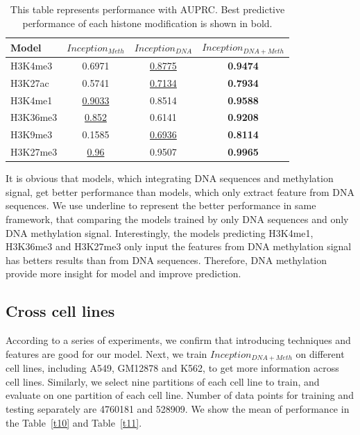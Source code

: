 \begin{table}[H]%
    \centering
    \begin{tabular}{lccc}
    \hline
    Model & $Inception_{Meth}$ & $Inception_{DNA}$ & $Inception_{DNA+Meth}$ \\\hline
    H3K4me3 & 0.6971 & \underline{0.8775} & \textbf{0.9474} \\
    H3K27ac & 0.5741 & \underline{0.7134} & \textbf{0.7934} \\
    H3K4me1 & \underline{0.9033} & 0.8514 & \textbf{0.9588} \\
    H3K36me3 & \underline{0.852} & 0.6141 & \textbf{0.9208} \\
    H3K9me3 & 0.1585 & \underline{0.6936} & \textbf{0.8114} \\
    H3K27me3 & \underline{0.96} & 0.9507 & \textbf{0.9965} \\\hline
    \end{tabular}
    \captionsetup{labelfont=bf}
    \renewcommand{\baselinestretch}{1.0}
    \caption[Comparison of different inputs of inception with AUPRC]{This table represents performance with AUPRC. Best predictive performance of each histone modification is shown in bold.}
    \label{t9}
\end{table}

It is obvious that models, which integrating DNA sequences and methylation signal, get better performance than models, which only extract feature from DNA sequences. We use underline to represent the better performance in same framework, that comparing the models trained by only DNA sequences and only DNA methylation signal. Interestingly, the models predicting H3K4me1, H3K36me3 and H3K27me3 only input the features from DNA methylation signal has betters results than from DNA sequences. Therefore, DNA methylation provide more insight for model and improve prediction.

\subsection{Cross cell lines} \label{cross}
According to a series of experiments, we confirm that introducing techniques and features are good for our model. Next, we train $Inception_{DNA+Meth}$ on  different cell lines, including A549, GM12878 and K562, to get more information across cell lines. Similarly, we select nine partitions of each cell line to train, and evaluate on one partition of each cell line. Number of data points for training and testing separately are 4760181 and 528909. We show the mean of performance in the Table~\ref{t10} and Table~\ref{t11}.

